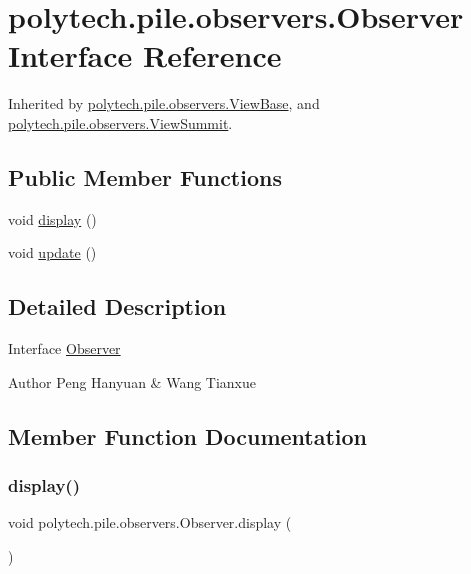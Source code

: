 \hypertarget{interfacepolytech_1_1pile_1_1observers_1_1_observer}{}\section{polytech.\+pile.\+observers.\+Observer Interface Reference}
\label{interfacepolytech_1_1pile_1_1observers_1_1_observer}


Inherited by \hyperlink{classpolytech_1_1pile_1_1observers_1_1_view_base}{polytech.\+pile.\+observers.\+View\+Base}, and \hyperlink{classpolytech_1_1pile_1_1observers_1_1_view_summit}{polytech.\+pile.\+observers.\+View\+Summit}.

\subsection*{Public Member Functions}
\begin{DoxyCompactItemize}
\item 
void \hyperlink{interfacepolytech_1_1pile_1_1observers_1_1_observer_a9a2e7784e992cb25888fdb22660f542c}{display} ()
\item 
void \hyperlink{interfacepolytech_1_1pile_1_1observers_1_1_observer_afeb6abcefc917edee5d1f33bfb76e6b1}{update} ()
\end{DoxyCompactItemize}


\subsection{Detailed Description}
Interface \hyperlink{interfacepolytech_1_1pile_1_1observers_1_1_observer}{Observer}

\begin{DoxyAuthor}{Author}
Peng Hanyuan \& Wang Tianxue 
\end{DoxyAuthor}


\subsection{Member Function Documentation}
\hypertarget{interfacepolytech_1_1pile_1_1observers_1_1_observer_a9a2e7784e992cb25888fdb22660f542c}{}\label{interfacepolytech_1_1pile_1_1observers_1_1_observer_a9a2e7784e992cb25888fdb22660f542c} 
\subsubsection{\texorpdfstring{display()}{display()}}
{\footnotesize\ttfamily void polytech.\+pile.\+observers.\+Observer.\+display (\begin{DoxyParamCaption}{ }\end{DoxyParamCaption})}



